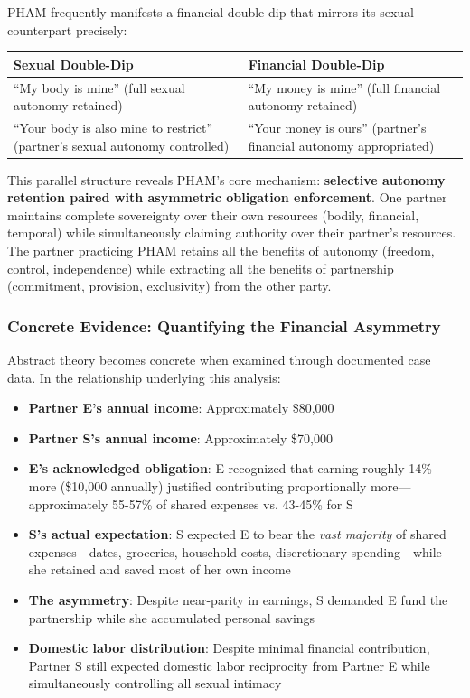 \documentclass[12pt, letterpaper]{article}
\begin{document}
PHAM frequently manifests a financial double-dip that mirrors its sexual counterpart precisely:

\begin{center}
\begin{tabular}{|p{2.5in}|p{2.5in}|}
\hline
\textbf{Sexual Double-Dip} & \textbf{Financial Double-Dip} \\
\hline
``My body is mine'' (full sexual autonomy retained) & ``My money is mine'' (full financial autonomy retained) \\
\hline
``Your body is also mine to restrict'' (partner's sexual autonomy controlled) & ``Your money is ours'' (partner's financial autonomy appropriated) \\
\hline
\end{tabular}
\end{center}

This parallel structure reveals PHAM's core mechanism: \textbf{selective autonomy retention paired with asymmetric obligation enforcement}. One partner maintains complete sovereignty over their own resources (bodily, financial, temporal) while simultaneously claiming authority over their partner's resources. The partner practicing PHAM retains all the benefits of autonomy (freedom, control, independence) while extracting all the benefits of partnership (commitment, provision, exclusivity) from the other party.

\subsubsection{Concrete Evidence: Quantifying the Financial Asymmetry}

Abstract theory becomes concrete when examined through documented case data. In the relationship underlying this analysis:

\begin{itemize}
    \item \textbf{Partner E's annual income}: Approximately \$80,000
    \item \textbf{Partner S's annual income}: Approximately \$70,000
    \item \textbf{E's acknowledged obligation}: E recognized that earning roughly 14\% more (\$10,000 annually) justified contributing proportionally more---approximately 55-57\% of shared expenses vs. 43-45\% for S
    \item \textbf{S's actual expectation}: S expected E to bear the \textit{vast majority} of shared expenses---dates, groceries, household costs, discretionary spending---while she retained and saved most of her own income
    \item \textbf{The asymmetry}: Despite near-parity in earnings, S demanded E fund the partnership while she accumulated personal savings
    \item \textbf{Domestic labor distribution}: Despite minimal financial contribution, Partner S still expected domestic labor reciprocity from Partner E while simultaneously controlling all sexual intimacy
\end{itemize}
\end{document}
